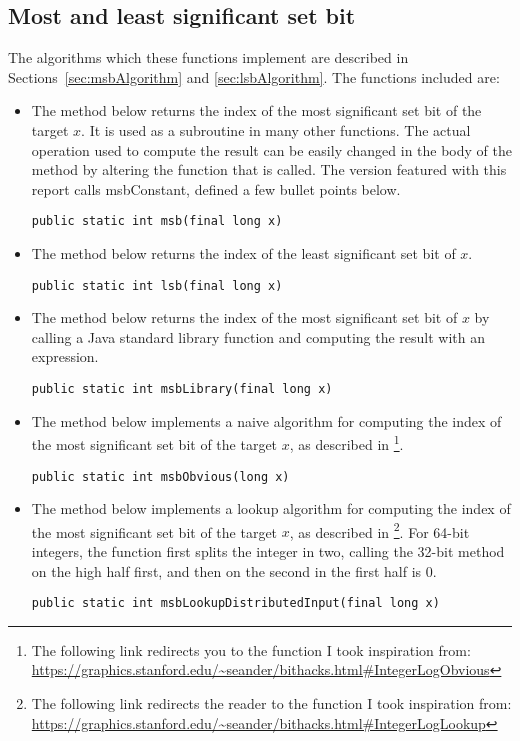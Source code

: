\subsection{Most and least significant set bit}

The algorithms which these functions implement are described in Sections~\ref{sec:msbAlgorithm} and \ref{sec:lsbAlgorithm}.
The functions included are:

\begin{itemize}
    \item
    The method below returns the index of the most significant set bit of the target $x$. It is used as a subroutine in many other functions. The actual operation used to compute the result can be easily changed in the body of the method by altering the function that is called. The version featured with this report calls {\ttfamily msbConstant}, defined a few bullet points below.
    \begin{lstlisting}
public static int msb(final long x)
    \end{lstlisting}
    
    \item
    The method below returns the index of the least significant set bit of $x$.
    \begin{lstlisting}
public static int lsb(final long x)
    \end{lstlisting}
    
    \item
    The method below returns the index of the most significant set bit of $x$ by calling a Java standard library function and computing the result with an expression.
    \begin{lstlisting}
public static int msbLibrary(final long x)
    \end{lstlisting}
    
    \item
    The method below implements a naive algorithm for computing the index of the most significant set bit of the target $x$, as described in \cite{bittricks}\footnote{The following link redirects you to the function I took inspiration from: \url{https://graphics.stanford.edu/~seander/bithacks.html\#IntegerLogObvious}}.
    \begin{lstlisting}
public static int msbObvious(long x)
    \end{lstlisting}
    
    \item
    The method below implements a lookup algorithm for computing the index of the most significant set bit of the target $x$, as described in \cite{bittricks}\footnote{The following link redirects the reader to the function I took inspiration from: \url{https://graphics.stanford.edu/~seander/bithacks.html\#IntegerLogLookup}}. For 64-bit integers, the function first splits the integer in two, calling the 32-bit method on the high half first, and then on the second in the first half is $0$.
    \begin{lstlisting}
public static int msbLookupDistributedInput(final long x)
    \end{lstlisting}


\end{itemize}
